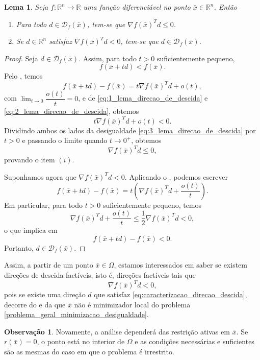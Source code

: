 \documentclass[12pt,a4paper]{scrartcl}
\def\RR{\mathds{R}}
\def\xbar{\bar{x}}
\newtheorem{lema}{Lema}
\theoremstyle{definition}%
\newtheorem{obs}{Observação}
\begin{document}
\begin{lema} \label{lema:direcao_de_descida}
Seja $f:\RR^{n} \rightarrow \RR$ uma função diferenciável no ponto $\xbar \in \RR^{n}$. Então
\begin{enumerate}
	\item[(i)] Para todo $d \in \mathcal{D}_{f}(\xbar)$, tem-se que $\nabla f(\xbar)^{T}d \leq 0$.

	\item[(ii)] Se $d\in \RR^{n}$ satisfaz $\nabla f(\xbar)^{T}d < 0$, tem-se que $d \in \mathcal{D}_{f}(\xbar)$.
\end{enumerate}	
\end{lema}
\begin{proof}
Seja $d \in \mathcal{D}_{f}(\xbar)$. Assim, para todo $t>0$ suficientemente pequeno, 
\[ \label{eq:1_lema_direcao_de_descida}
f(\xbar + td) < f(\xbar).
\]
Pelo , temos
\[ \label{eq:2_lema_direcao_de_descida}
f(\xbar + td) - f(\xbar) = t\nabla f(\xbar)^{T} d + o(t),
\] 
com $\lim_{t\rightarrow 0} \dfrac{o(t)}{t} =0$, e de \eqref{eq:1_lema_direcao_de_descida} e \eqref{eq:2_lema_direcao_de_descida}, obtemos
\[ \label{eq:3_lema_direcao_de_descida}
t\nabla f(\xbar)^{T}d + o(t) < 0.
\]
Dividindo ambos os lados da desigualdade \eqref{eq:3_lema_direcao_de_descida} por $t>0$ e passando o limite quando $t \rightarrow 0^{+}$, obtemos
\[
\nabla f(\xbar)^{T}d \leq 0,
\]
provando o item $(i)$.

Suponhamos agora que $\nabla f(\xbar)^{T}d <0$. Aplicando o , podemos escrever
\[
f(\xbar + td) - f(\xbar) = t\left( \nabla f(\xbar)^{T}d + \dfrac{o(t)}{t} \right) .
\]
Em particular, para todo $t>0$ suficientemente pequeno, temos
\[
\nabla f(\xbar)^{T}d + \dfrac{o(t)}{t} \leq \dfrac{1}{2} \nabla f(\xbar)^{T}d <0,
\]
o que implica em
\[
f(\xbar + td) - f(\xbar) <0.
\]
Portanto, $d \in \mathcal{D}_{f}(\xbar)$.
\end{proof}

Assim, a partir de um ponto $\xbar \in \Omega$, estamos interessados em saber se existem direções de descida factíveis, isto é, direções factíveis tais que
\[ \label{eq:caracterizacao_direcao_descida}
\nabla f(\xbar)^{T}d < 0,
\]
pois se existe uma direção $d$ que satisfaz \eqref{eq:caracterizacao_direcao_descida}, decorre do  e da  que $\xbar$ não é minimizador local do problema \eqref{problema_geral_minimizacao_desigualdade}.

\begin{obs}
Novamente, a análise dependerá das restrição ativas em $\xbar$. Se $r(\xbar) =0$, o ponto está no interior de $\Omega$ e as condições necessárias e suficientes são as mesmas do caso em que o problema é irrestrito.
\end{obs}
\end{document}
